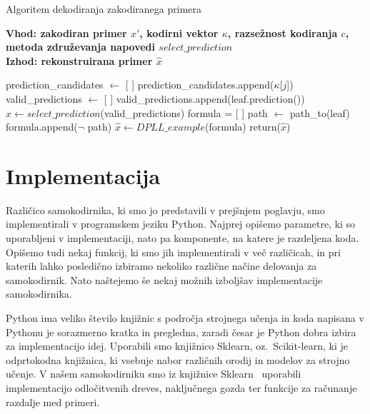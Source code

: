 \documentclass[12pt,a4paper,twoside]{article}
\theoremstyle{definition} %
\theoremstyle{plain} %
\numberwithin{equation}{section}  %
\begin{document}
\begin{algorithm}[h!]
	\caption{Algoritem dekodiranja zakodiranega primera}
	\label{algoritem-decode}
	\raggedright
	\textbf{Vhod: zakodiran primer $x'$, kodirni vektor $\kappa$, razsežnost kodiranja $c$, metoda združevanja napovedi $select\_prediction$}  \\
	\textbf{Izhod: rekonstruirana primer $\hat{x}$} 
	\begin{algorithmic}[0]
			\State prediction\_candidates $\gets$ [ ]
				\State prediction\_candidates.append($\kappa$[$j$])
			\EndIf
		\EndFor
			\State valid\_predictions $\gets$ [ ]
				\State valid\_predictions.append(leaf.prediction())
			\EndFor
			\State $\hat{x} \gets select\_prediction$(valid\_predictions) 
		\Else
			\State formula = [ ]
				\State path $\gets$ path\_to(leaf)
				\State formula.append($\lnot$ path)
			\EndFor
			\State $\hat{x} \gets DPLL\_example$(formula)
		\EndIf
		\State return($\hat{x}$)
	\end{algorithmic}
\end{algorithm}



\section{Implementacija}
\label{pogl:implementacija}

Različico samokodirnika, ki smo jo predstavili v prejšnjem poglavju, smo implementirali v programskem jeziku Python.
Najprej opišemo parametre, ki so uporabljeni v implementaciji, nato pa komponente, na katere je razdeljena koda.
Opišemo tudi nekaj funkcij, ki smo jih implementirali v več različicah, in pri katerih lahko posledično izbiramo nekoliko različne načine delovanja za samokodirnik.
Nato naštejemo še nekaj možnih izboljšav implementacije samokodirnika.

Python ima veliko število knjižnic s področja strojnega učenja in koda napisana v Pythonu je sorazmerno kratka in pregledna, zaradi česar je Python dobra izbira za implementacijo idej.
Uporabili smo knjižnico Sklearn, oz.\ Scikit-learn, ki je odprtokodna knjižnica, ki vsebuje nabor različnih orodij in modelov za strojno učenje.
V našem samokodirniku smo iz knjižnice Sklearn~\cite{scikit-learn} uporabili implementacijo odločitvenih dreves, naključnega gozda ter funkcije za računanje razdalje med primeri.
\end{document}
